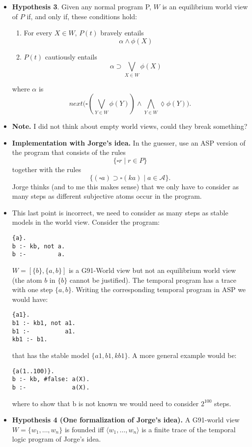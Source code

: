 \documentclass{article}
\begin{document}
\begin{itemize}
\item
\textbf{Hypothesis 3}.
Given any normal program P, $W$ is an equilibrium world view of $P$ if, and only if, these conditions hold:
\begin{enumerate}
    \item For every $X \in W$, $P(t)$ bravely entails 
    \[\alpha \wedge \phi(X)\]
    \item $P(t)$ cautiously entails 
    \[\alpha \supset \bigvee_{X \in W}\phi(X)
    \]
\end{enumerate}
where $\alpha$ is
\[next\big(\square(\bigvee_{Y \in W}\phi(Y)) \wedge \bigwedge_{Y \in W}\lozenge\phi(Y)\big).\] 

\item
\textbf{Note.} 
I did not think about empty world views, could they break something?

\item
\textbf{Implementation with Jorge's idea.}
In the guesser, use an ASP version of the program that consists of the rules
\[\{\square r \mid r \in P\}\] 
together with the rules
\[\{(\square a) \supset \square(ka) \mid a \in \mathcal{A}\}.\]
%
Jorge thinks (and to me this makes sense) that we only have to consider as many steps as different subjective atoms occur in the program.

\item
This last point is incorrect, we need to consider as many steps as
stable models in the world view.
Consider the program:
\begin{verbatim}
{a}.
b :- kb, not a.
b :-         a.
\end{verbatim}
$W=[\{b\},\{a,b\}]$ is a G91-World view but 
not an equilibrium world view
(the atom $b$ in $\{b\}$ cannot be justified).
%
The temporal program has a trace with one step $\{a,b\}$.
%
Writing the corresponding temporal program in ASP we would have:
\begin{verbatim}
{a1}.
b1 :- kb1, not a1.
b1 :-          a1.
kb1 :- b1.
\end{verbatim}
that has the stable model $\{a1,b1,kb1\}$.
%
A more general example would be:
\begin{verbatim}
{a(1..100)}.
b :- kb, #false: a(X).
b :-             a(X).
\end{verbatim}
where to show that b is not known we would need 
to consider $2^{100}$ steps.

\item 
\textbf{Hypothesis 4 (One formalization of Jorge's idea).}
A G91-world view $W=\{w_1, \ldots, w_n\}$ is founded iff
$\langle w_1, \ldots, w_n \rangle$ is a 
finite trace of the temporal logic program of Jorge's idea.
\end{itemize}
\end{document}
